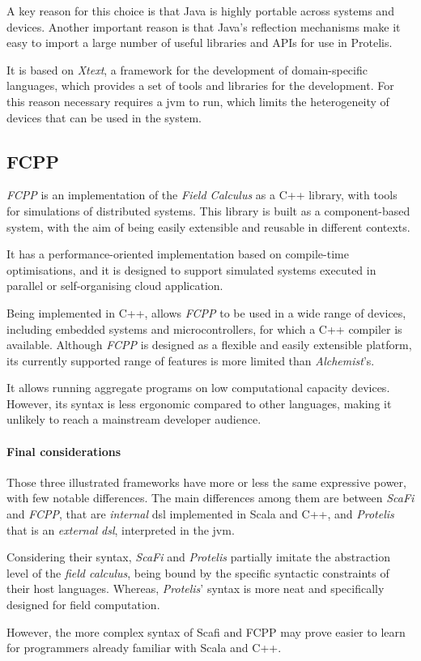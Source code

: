 A key reason for this choice is that Java is highly portable across systems and devices.
Another important reason is that Java's reflection mechanisms make it easy to import a large number of useful libraries
and APIs for use in Protelis.

It is based on \emph{Xtext}, a framework for the development of domain-specific languages, which provides a set of tools
and libraries for the development.
For this reason necessary requires a \ac{jvm} to run, which limits the heterogeneity of devices
that can be used in the system.

\subsection{FCPP}
\label{subsec:fcpp}
\emph{FCPP} is an implementation of the \emph{Field Calculus} as a C++ library, with tools for simulations of distributed systems.
This library is built as a component-based system, with the aim of being easily extensible and reusable in different contexts.

It has a performance-oriented implementation based on compile-time optimisations, and it is designed to support
simulated systems executed in parallel or self-organising cloud application.

Being implemented in C++, allows \emph{FCPP} to be used in a wide range of devices, including embedded systems and
microcontrollers, for which a C++ compiler is available.
Although \emph{FCPP} is designed as a flexible and easily extensible platform, its currently supported range of features
is more limited than \emph{Alchemist}'s.

It allows running aggregate programs on low computational capacity devices.
However, its syntax is less ergonomic compared to other languages, making it unlikely to reach a mainstream developer audience.

\paragraph{Final considerations}
Those three illustrated frameworks have more or less the same expressive power, with few notable differences.
The main differences among them are between \emph{ScaFi} and \emph{FCPP}, that are \emph{internal} \ac{dsl} implemented in Scala
and C++, and \emph{Protelis} that is an \emph{external} \emph{dsl}, interpreted in the \ac{jvm}.

Considering their syntax, \emph{ScaFi} and \emph{Protelis} partially imitate the abstraction level of the \emph{field calculus},
being bound by the specific syntactic constraints of their host languages.
Whereas, \emph{Protelis}' syntax is more neat and specifically designed for field computation.

However, the more complex syntax of Scafi and FCPP may prove easier to learn for programmers already familiar with Scala and C++.